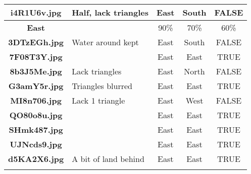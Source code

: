 \documentclass{article}
\begin{document}
\begin{table}[h!]
{\begin{tabular}{|c|p{4cm}|c|c|c|}
            \rowcolor{gray!10}
            \textbf{i4R1U6v.jpg} & Half, lack triangles         & East                          & South                            & FALSE                \\ \hline
            \rowcolor{gray!40}
            \textbf{East}        &                              & 90\%                          & 70\%                             & 60\%                 \\ \hline
            \rowcolor{gray!0}
            \textbf{3DTzEGh.jpg} & Water around kept            & East                          & South                            & FALSE                \\ \hline
            \rowcolor{gray!10}
            \textbf{7F08T3Y.jpg} &                              & East                          & East                             & TRUE                 \\ \hline
            \rowcolor{gray!0}
            \textbf{8b3J5Me.jpg} & Lack triangles               & East                          & North                            & FALSE                \\ \hline
            \rowcolor{gray!10}
            \textbf{G3amY5r.jpg} & Triangles blurred            & East                          & East                             & TRUE                 \\ \hline
            \rowcolor{gray!0}
            \textbf{MI8n706.jpg} & Lack 1 triangle              & East                          & West                             & FALSE                \\ \hline
            \rowcolor{gray!10}
            \textbf{QO80o8u.jpg} &                              & East                          & East                             & TRUE                 \\ \hline
            \rowcolor{gray!0}
            \textbf{SHmk487.jpg} &                              & East                          & East                             & TRUE                 \\ \hline
            \rowcolor{gray!10}
            \textbf{UJNcds9.jpg} &                              & East                          & East                             & TRUE                 \\ \hline
            \rowcolor{gray!0}
            \textbf{d5KA2X6.jpg} & A bit of land behind         & East                          & East                             & TRUE                 \\ \hline
            \rowcolor{gray!10}

\end{tabular}}
\end{table}
\end{document}
